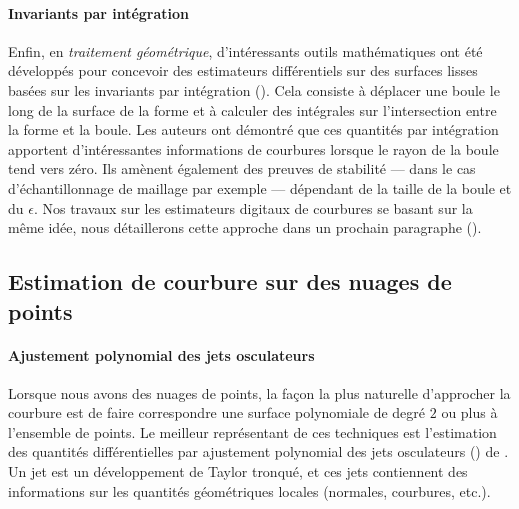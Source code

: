 \paragraph{Invariants par intégration}
%
Enfin, en \emph{traitement géométrique}, d'intéressants outils mathématiques ont
été développés pour concevoir des estimateurs différentiels sur des surfaces
lisses basées sur les invariants par intégration
(). Cela consiste à déplacer une
boule le long de la surface de la forme et à calculer des intégrales sur
l'intersection entre la forme et la boule. Les auteurs ont démontré que ces
quantités par intégration apportent d'intéressantes informations de courbures
lorsque le rayon de la boule tend vers zéro. Ils amènent également des preuves
de stabilité --- dans le cas d'échantillonnage de maillage par exemple ---
dépendant de la taille de la boule et du $\epsilon$. Nos travaux sur les
estimateurs digitaux de courbures se basant sur la même idée, nous détaillerons
cette approche dans un prochain paragraphe
().
%
\subsection{Estimation de courbure sur des nuages de points}
%
\paragraph{Ajustement polynomial des jets osculateurs}
%
Lorsque nous avons des nuages de points, la façon la plus naturelle d'approcher
la courbure est de faire correspondre une surface polynomiale de degré $2$ ou
plus à l'ensemble de points. Le meilleur représentant de ces techniques est
l'estimation des quantités différentielles par ajustement polynomial des jets
osculateurs () de .
%
\\
%
Un jet est un développement de Taylor tronqué, et ces jets contiennent des
informations sur les quantités géométriques locales (normales, courbures, etc.).



